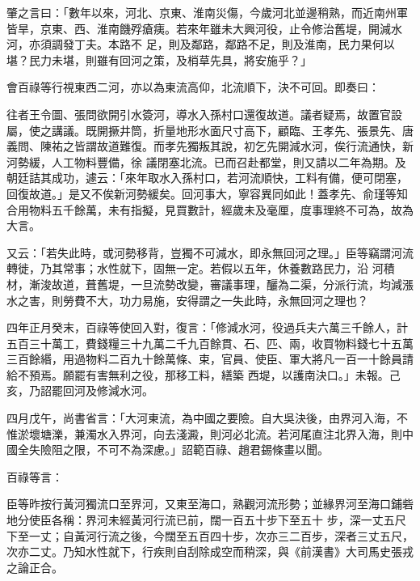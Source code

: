 \begin{pinyinscope}
 肇之言曰：「數年以來，河北、京東、淮南災傷，今歲河北並邊稍熟，而近南州軍皆旱，京東、西、淮南饑殍瘡痍。若來年雖未大興河役，止令修治舊堤，開減水河，亦須調發丁夫。本路不
 足，則及鄰路，鄰路不足，則及淮南，民力果何以堪？民力未堪，則雖有回河之策，及梢草先具，將安施乎？」



 會百祿等行視東西二河，亦以為東流高仰，北流順下，決不可回。即奏曰：



 往者王令圖、張問欲開引水簽河，導水入孫村口還復故道。議者疑焉，故置官設屬，使之講議。既開撅井筒，折量地形水面尺寸高下，顧臨、王孝先、張景先、唐義問、陳祐之皆謂故道難復。而孝先獨叛其說，初乞先開減水河，俟行流通快，新河勢緩，人工物料豐備，徐
 議閉塞北流。已而召赴都堂，則又請以二年為期。及朝廷詰其成功，遽云：「來年取水入孫村口，若河流順快，工料有備，便可閉塞，回復故道。」是又不俟新河勢緩矣。回河事大，寧容異同如此！蓋孝先、俞瑾等知合用物料五千餘萬，未有指擬，見買數計，經歲未及毫厘，度事理終不可為，故為大言。



 又云：「若失此時，或河勢移背，豈獨不可減水，即永無回河之理。」臣等竊謂河流轉徙，乃其常事；水性就下，固無一定。若假以五年，休養數路民力，沿
 河積材，漸浚故道，葺舊堤，一旦流勢改變，審議事理，釃為二渠，分派行流，均減漲水之害，則勞費不大，功力易施，安得謂之一失此時，永無回河之理也？



 四年正月癸末，百祿等使回入對，復言：「修減水河，役過兵夫六萬三千餘人，計五百三十萬工，費錢糧三十九萬二千九百餘貫、石、匹、兩，收買物料錢七十五萬三百餘緡，用過物料二百九十餘萬條、束，官員、使臣、軍大將凡一百一十餘員請給不預焉。願罷有害無利之役，那移工料，繕築
 西堤，以護南決口。」未報。己亥，乃詔罷回河及修減水河。



 四月戊午，尚書省言：「大河東流，為中國之要險。自大吳決後，由界河入海，不惟淤壞塘濼，兼濁水入界河，向去淺澱，則河必北流。若河尾直注北界入海，則中國全失險阻之限，不可不為深慮。」詔範百祿、趙君錫條畫以聞。



 百祿等言：



 臣等昨按行黃河獨流口至界河，又東至海口，熟觀河流形勢；並緣界河至海口鋪砦地分使臣各稱：界河未經黃河行流已前，闊一百五十步下至五十
 步，深一丈五尺下至一丈；自黃河行流之後，今闊至五百四十步，次亦三二百步，深者三丈五尺，次亦二丈。乃知水性就下，行疾則自刮除成空而稍深，與《前漢書》大司馬史張戎之論正合。




\end{pinyinscope}
